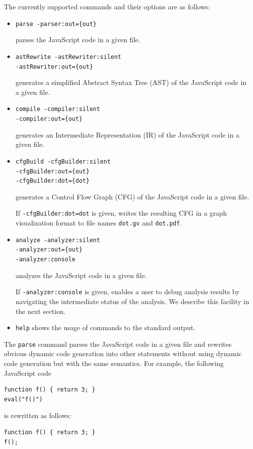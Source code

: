 The currently supported commands and their options are as follows:
\begin{itemize}
\item \verb!parse -parser:out={out}!

parses the JavaScript code in a given file.
\item \verb!astRewrite -astRewriter:silent!\\
\hspace*{5.8em}\verb!-astRewriter:out={out}!

generates a simplified Abstract Syntax Tree (AST)
of the  JavaScript code in a given file.
\item \verb!compile -compiler:silent!\\
\hspace*{4.2em}\verb!-compiler:out={out}!

generates an Intermediate Representation (IR)
of the  JavaScript code in a given file.
\item \verb!cfgBuild -cfgBuilder:silent!\\
\hspace*{4.8em}\verb!-cfgBuilder:out={out}!\\
\hspace*{4.8em}\verb!-cfgBuilder:dot={dot}!

generates a Control Flow Graph (CFG) of the  JavaScript code in a given file.

If \verb!-cfgBuilder:dot=dot! is given,
\safe writes the resulting CFG in a graph visualization format
to file names \verb!dot.gv! and \verb!dot.pdf!.

\item \verb!analyze -analyzer:silent!\\
\hspace*{4.4em}\verb!-analyzer:out={out}!\\
\hspace*{4.4em}\verb!-analyzer:console!

analyzes the  JavaScript code in a given file.

If \verb!-analyzer:console! is given,
\safe enables a user to debug analysis results by navigating the intermediate
status of the analysis.
We describe this facility in the next section.

\item \verb!help! shows the usage of \safe commands to the standard output.
\end{itemize}

\medskip
The \verb!parse! command parses the JavaScript code in a given file and
rewrites obvious dynamic code generation into other statements without using
dynamic code generation but with the same semantics.  For example, the following
JavaScript code
\begin{verbatim}
function f() { return 3; }
eval("f()")
\end{verbatim}
is rewritten as follows:
\begin{verbatim}
function f() { return 3; }
f();
\end{verbatim}

